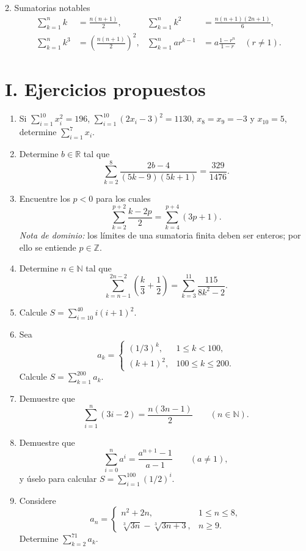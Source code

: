 \documentclass[letterpaper,12pt,twoside]{article}
\newcommand{\R}{\mathbb{R}}
\newcommand{\N}{\mathbb{N}}
\newcommand{\Z}{\mathbb{Z}}
\begin{document}
\begin{theorybox}{2. Sumatorias notables}
\begin{align*}
\sum_{k=1}^{n}k&=\frac{n(n+1)}2,&
\sum_{k=1}^{n}k^2&=\frac{n(n+1)(2n+1)}6,\\
\sum_{k=1}^{n}k^3&=\left(\frac{n(n+1)}2\right)^2,&
\sum_{k=1}^{n}ar^{k-1}&=a\frac{1-r^n}{1-r}\quad(r\ne1).
\end{align*}
\end{theorybox}

\newpage
\section*{I. Ejercicios propuestos}
\begin{enumerate}[label=\textbf{\arabic*)},leftmargin=*,itemsep=1.1em]
\item Si $\sum_{i=1}^{10}x_i^2=196$, $\sum_{i=1}^{10}(2x_i-3)^2=1130$,
$x_8=x_9=-3$ y $x_{10}=5$, determine $\displaystyle\sum_{i=1}^{7}x_i$.

\item Determine $b\in\R$ tal que
\[\sum_{k=2}^{8}\frac{2b-4}{(5k-9)(5k+1)}=\frac{329}{1476}.\]

\item Encuentre los $p<0$ para los cuales
\[\sum_{k=2}^{p+2}\frac{k-2p}{2}=\sum_{k=4}^{p+4}(3p+1).\]
\textit{Nota de dominio:} los límites de una sumatoria finita deben ser enteros; por ello se entiende $p\in\Z$.

\item Determine $n\in\N$ tal que
\[\sum_{k=n-1}^{2n-2}\left(\frac{k}{3}+\frac12\right)
=\sum_{k=3}^{11}\frac{115}{8k^2-2}.\]

\item Calcule $\displaystyle S=\sum_{i=10}^{40}i(i+1)^2$.

\item Sea
\[a_k=\begin{cases}(1/3)^k,&1\le k<100,\\(k+1)^2,&100\le k\le200.
\end{cases}\]
Calcule $\displaystyle S=\sum_{k=1}^{200}a_k$.

\item Demuestre que
\[\sum_{i=1}^{n}(3i-2)=\frac{n(3n-1)}2\qquad(n\in\N).\]

\item Demuestre que
\[\sum_{i=0}^{n}a^i=\frac{a^{n+1}-1}{a-1}\qquad(a\ne1),\]
y úselo para calcular $\displaystyle S=\sum_{i=1}^{100}(1/2)^i$.

\item Considere
\[a_n=\begin{cases}n^2+2n,&1\le n\le8,\\
\sqrt[3]{3n}-\sqrt[3]{3n+3},&n\ge9.
\end{cases}\]
Determine $\displaystyle\sum_{k=2}^{71}a_k$.


\end{enumerate}
\end{document}
